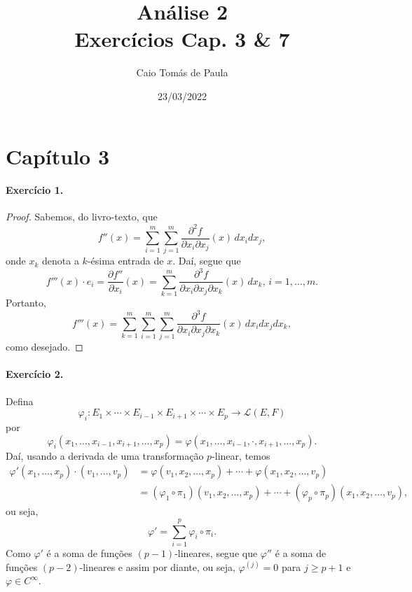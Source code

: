 \documentclass[12pt,a4paper]{article}
\title{\textbf{Análise 2}\\ Exercícios Cap. 3 \& 7}
\author{Caio Tomás de Paula}
\date{23/03/2022}
\begin{document}
\maketitle

\section{Capítulo 3}

\paragraph{Exercício 1.}
%
\begin{proof}
    Sabemos, do livro-texto, que
    \begin{equation*}
        f''(x) = \sum_{i=1}^m\sum_{j=1}^m \frac{ \partial^2 f }
        {\partial x_i \partial x_j} (x) \, dx_idx_j,
    \end{equation*}
    onde $x_k$ denota a $k$-ésima entrada de $x$. Daí, segue que
    \begin{equation*}
        f'''(x)\cdot e_i = 
        \frac{ \partial f'' }{ \partial x_i } (x)
        = \sum_{k=1}^m \frac{ \partial^3 f }
        {\partial x_i \partial x_j \partial x_k} (x) \, dx_k, \, i=1,\dots,m.
    \end{equation*}
    Portanto,
    \begin{equation*}
        f'''(x) = \sum_{k=1}^m\sum_{i=1}^m\sum_{j=1}^m 
        \frac{ \partial^3 f }
        {\partial x_i \partial x_j \partial x_k} (x) \, dx_idx_jdx_k,
    \end{equation*}
    como desejado.
\end{proof}
%
\paragraph{Exercício 2.}
%
Defina
%
\begin{equation*}
    \varphi_i : 
    E_1 \times \cdots \times E_{i-1} \times E_{i+1} \times \cdots \times E_p \to
    \mathcal{L}(E,F)
\end{equation*}
%
por
%
\begin{equation*}
    \varphi_i(x_1, \dots, x_{i-1}, x_{i+1}, \dots, x_p) = 
    \varphi(x_1, \dots, x_{i-1}, \cdot, x_{i+1}, \dots, x_p).
\end{equation*}
%
Daí, usando a derivada de uma transformação $p$-linear, temos
%
\begin{align*}
    \varphi'(x_1, \dots, x_p)\cdot(v_1, \dots, v_p) &=
    \varphi(v_1, x_2, \dots, x_p) + \cdots + \varphi(x_1, x_2, \dots, v_p) \\
    &= (\varphi_1\circ\pi_1)(v_1, x_2, \dots, x_p) + \cdots +
    (\varphi_p\circ\pi_p)(x_1, x_2, \dots, v_p),
\end{align*}
%
ou seja,
%
\begin{equation*}
    \varphi' = \sum_{i=1}^p \varphi_i\circ\pi_i.
\end{equation*}
%
Como $\varphi'$ é a soma de funções $(p-1)$-lineares, segue que $\varphi''$
é a soma de funções $(p-2)$-lineares e assim por diante, ou seja, $\varphi^{(j)} = 0$
para $j\geq p+1$ e $\varphi\in C^{\infty}$.
%
\end{document}
